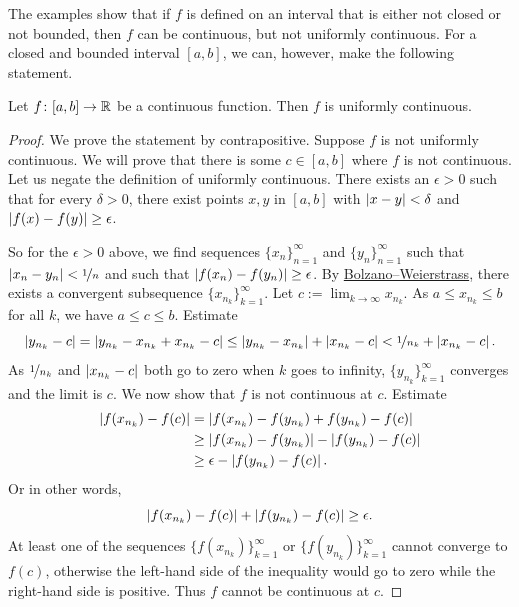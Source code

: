 The examples show that if $f$ is defined on an interval that is either not closed
or not bounded, then $f$ can be continuous, but not uniformly continuous.
For a closed and bounded interval $[a,b]$, we can, however,
make the following statement.

\begin{thm} \label{unifcont:thm}
Let $f \colon [a,b] \to {\mathbb{R}}$ be a continuous function.  Then $f$
is uniformly continuous.
\end{thm}

\begin{proof}
We prove the statement by contrapositive.
Suppose $f$ is not uniformly continuous.  We will prove
that there is some
$c \in [a,b]$ where $f$ is not continuous.  Let us negate
the definition of uniformly continuous.
There exists an $\epsilon > 0$
such that for every $\delta > 0$, there exist points $x, y$ in $[a,b]$ with
$\left\lvert {x-y} \right\rvert < \delta$ and $\left\lvert {f(x)-f(y)} \right\rvert \geq \epsilon$.

So for the $\epsilon > 0$ above,
we find sequences $\{ x_n \}_{n=1}^\infty$ and $\{ y_n \}_{n=1}^\infty$ such that
$\left\lvert {x_n-y_n} \right\rvert < \nicefrac{1}{n}$ and such that $\left\lvert {f(x_n)-f(y_n)} \right\rvert \geq
\epsilon$.  By
\hyperref[thm:bwseq]{Bolzano--Weierstrass},
there exists a convergent subsequence
$\{ x_{n_k} \}_{k=1}^\infty$.  Let $c := \lim_{k\to\infty} x_{n_k}$.
As $a \leq x_{n_k} \leq b$ for all $k$, we have $a \leq c \leq b$.  Estimate
\begin{equation*}
\left\lvert {y_{n_k} - c} \right\rvert =
\left\lvert {y_{n_k} - x_{n_k} + x_{n_k} - c} \right\rvert \leq
\left\lvert {y_{n_k} - x_{n_k}} \right\rvert
+
\left\lvert {x_{n_k}-c} \right\rvert
<
\nicefrac{1}{n_k} 
+
\left\lvert {x_{n_k}-c} \right\rvert .
\end{equation*}
As $\nicefrac{1}{n_k}$ and $\left\lvert {x_{n_k}-c} \right\rvert$ both go to zero when
$k$ goes to infinity, $\{ y_{n_k} \}_{k=1}^\infty$ converges and the limit
is $c$.  We now show that $f$ is not continuous at $c$.
Estimate
\begin{equation*}
\begin{split}
\left\lvert {f(x_{n_k}) - f(c)} \right\rvert & =
\left\lvert {f(x_{n_k}) - f(y_{n_k}) + f(y_{n_k}) - f(c)} \right\rvert \\
& \geq
\left\lvert {f(x_{n_k}) - f(y_{n_k})} \right\rvert - \left\lvert {f(y_{n_k}) - f(c)} \right\rvert \\
& \geq
\epsilon - \left\lvert {f(y_{n_k})-f(c)} \right\rvert .
\end{split}
\end{equation*}
Or in other words,
\begin{equation*}
\left\lvert {f(x_{n_k})-f(c)} \right\rvert 
+
\left\lvert {f(y_{n_k})-f(c)} \right\rvert  \geq
\epsilon .
\end{equation*}
At least one of the sequences $\bigl\{ f(x_{n_k}) \bigr\}_{k=1}^\infty$  or
$\bigl\{ f(y_{n_k}) \bigr\}_{k=1}^\infty$ cannot converge to $f(c)$, otherwise the
left-hand side of the inequality would go to zero while the right-hand side is positive.
Thus $f$ cannot be continuous at $c$.
\end{proof}


